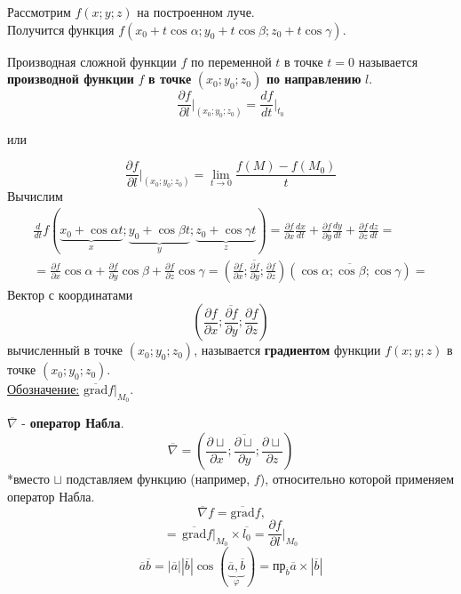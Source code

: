 \documentclass[12pt]{article}
\begin{document}
    Рассмотрим $f(x;y;z)$ на построенном луче.\\
    Получится функция $f(x_0 + t\cos \alpha; y_0 + t \cos \beta; z_0 + t \cos \gamma)$.\par\noindent
    Производная сложной функции $f$ по переменной $t$ в точке $t = 0$ называется \textbf{производной функции} $f$ \textbf{в точке} $(x_0; y_0; z_0)$ \textbf{по направлению} $l$.
    \[ \frac{\partial f}{\partial l} \Big|_{(x_0; y_0; z_0)} = \frac{df}{dt}\Big|_{t_0} \]
    \begin{center}
        или
        \end{center}
    \[ \frac{\partial f}{\partial l} \Big|_{(x_0; y_0; z_0)} = \lim_{t \to 0}\frac{f(M) - f(M_0)}{t} \]
    Вычислим
    \begin{gather*}
        \frac{d}{dt}f(\underbrace{x_0 + \cos \alpha t}_x; \underbrace{y_0 + \cos \beta t}_y; \underbrace{z_0 + \cos \gamma t}_z) = \frac{\partial f}{\partial x} \frac{dx}{dt} + \frac{\partial f}{\partial y} \frac{dy}{dt} + \frac{\partial f}{\partial z} \frac{dz}{dt} =\\
        = \frac{\partial f}{\partial x} \cos \alpha + \frac{\partial f}{\partial y} \cos \beta + \frac{\partial f}{\partial z} \cos \gamma = \left( \overline{\frac{\partial f}{\partial x}; \frac{\partial f}{\partial y}; \frac{\partial f}{\partial z}} \right)\left( \overline{\cos \alpha; \cos \beta; \cos \gamma} \right) \boxed{=}
    \end{gather*}
    Вектор с координатами 
    \[ \left( \overline{\frac{\partial f}{\partial x}; \frac{\partial f}{\partial y}; \frac{\partial f}{\partial z}} \right) \]
    вычисленный в точке $(x_0; y_0; z_0)$, называется \textbf{градиентом} функции $f(x; y; z)$ в точке $(x_0; y_0; z_0)$.\\
    \underline{Обозначение:} $\overline{\text{grad}}f \Big|_{M_0}$.\par\noindent
    $\overline{\nabla}$ - \textbf{оператор Набла}.
    \[ \overline{\nabla} = \left( \overline{ \frac{\partial \sqcup}{\partial x}; \frac{\partial \sqcup}{\partial y}; \frac{\partial \sqcup}{\partial z} } \right) \]
    *вместо $\sqcup$ подставляем функцию (например, $f$), относительно которой применяем оператор Набла.
    \[ \overline{\nabla} f = \overline{\text{grad}}f\text{,} \]
    \[ \boxed{=} \, \boxed{ \overline{\text{grad}}f\Big|_{M_0} \times \overline{l_0} = \frac{\partial f}{\partial l}\Big|_{M_0} } \]
    \[ \overline{a}\overline{b} = |\overline{a}||\overline{b}|\cos(\underbrace{\overline{a}, \overline{b}}_{\varphi}) = \text{пр}_{\overline{b}} \overline{a} \times |\overline{b}| \]
\end{document}
